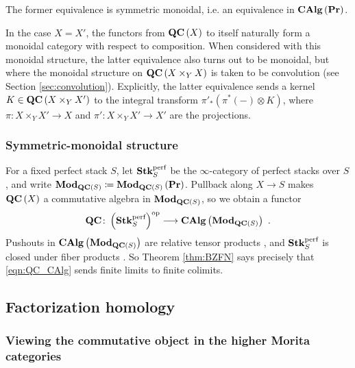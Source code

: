 \begin{rmk}
\label{rmk:BZFN_monoidal}
The former equivalence is symmetric monoidal, i.e. an equivalence in
$\mathbf{CAlg}\left(\mathbf{Pr}\right)$.

In the case $X = X'$, the functors from $\mathbf{QC}\left(X\right)$ to itself naturally form a
monoidal category with respect to composition. When considered with this monoidal
structure, the latter equivalence also turns out
to be monoidal, but where the monoidal structure on $\mathbf{QC}\left(X\times_Y X\right)$ is taken
to be convolution (see Section \ref{sec:convolution}).
Explicitly, the latter equivalence sends a kernel $K\in \mathbf{QC}\left(X\times_Y X'\right)$ to
the integral transform $\pi'_{*} \left( \pi^* \left(-\right)\otimes K\right)$, where
$\pi\colon X\times_Y X'\to X$ and $\pi'\colon X\times_Y X'\to X'$ are the projections.
\end{rmk}

\subsubsection{Symmetric-monoidal structure}

For a fixed perfect stack $S$, let $\mathbf{Stk}_S^{\text{perf}}$ be the $\infty$-category of perfect
stacks over $S$, and write
$\mathbf{Mod}_{\mathbf{QC}\left(S\right)}\coloneqq\mathbf{Mod}_{\mathbf{QC}\left(S\right)}\left(\mathbf{Pr}\right)$.
Pullback along $X\to S$ makes $\mathbf{QC}\left(X\right)$ a commutative algebra in
$\mathbf{Mod}_{\mathbf{QC}\left(S\right)}$, so we obtain a functor
\begin{equation}
\mathbf{QC}\colon\left(\mathbf{Stk}_S^{\text{perf}}\right)^{\text{op}}\longrightarrow\mathbf{CAlg}\left(\mathbf{Mod}_{\mathbf{QC}\left(S\right)}\right)
\ .
\label{eqn:QC_CAlg}
\end{equation}
Pushouts in $\mathbf{CAlg}\left(\mathbf{Mod}_{\mathbf{QC}\left(S\right)}\right)$ are relative tensor products
\cite[Proposition 3.2.4.7 and Section 4.5]{L:HA}, and $\mathbf{Stk}_S^{\text{perf}}$ is closed under fiber products
\cite[\S 3]{BZFN}.
So Theorem \ref{thm:BZFN} says precisely that \eqref{eqn:QC_CAlg} sends finite limits to
finite colimits.

\subsection{Factorization homology}
\label{sec:fac_hom}

\subsubsection{Viewing the commutative object in the higher Morita categories}
\label{sec:QC_Algn}

